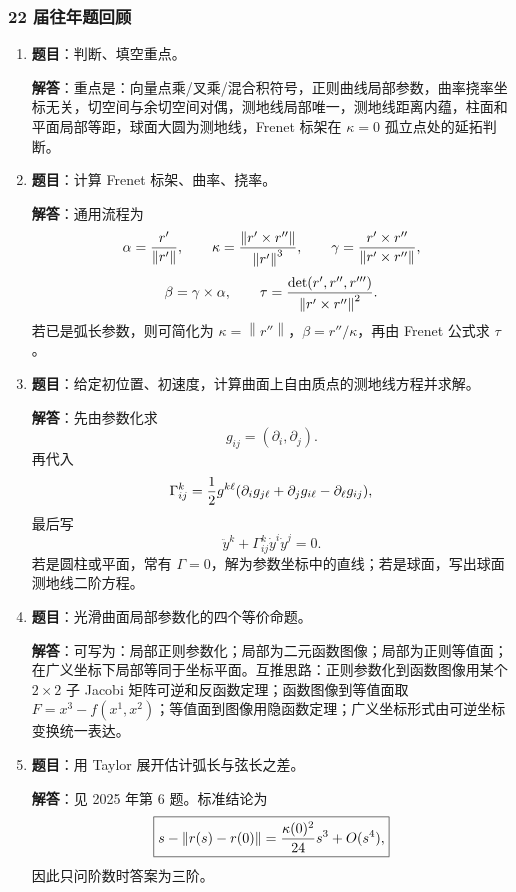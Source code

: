 \documentclass[UTF8,12pt,a4paper]{ctexart}
\newcommand{\norm}[1]{\left\lVert #1\right\rVert}
\newcommand{\inner}[2]{\left(#1,#2\right)}
\begin{document}
\subsubsection{22 届往年题回顾}
\begin{enumerate}
\item \textbf{题目}：判断、填空重点。

\textbf{解答}：重点是：向量点乘/叉乘/混合积符号，正则曲线局部参数，曲率挠率坐标无关，切空间与余切空间对偶，测地线局部唯一，测地线距离内蕴，柱面和平面局部等距，球面大圆为测地线，Frenet 标架在 $\kappa=0$ 孤立点处的延拓判断。

\item \textbf{题目}：计算 Frenet 标架、曲率、挠率。

\textbf{解答}：通用流程为
\[
\alpha={r'\over\norm{r'}},\qquad
\kappa={\norm{r'\times r''}\over\norm{r'}^3},\qquad
\gamma={r'\times r''\over\norm{r'\times r''}},
\]
\[
\beta=\gamma\times\alpha,\qquad
\tau={\det(r',r'',r''')\over\norm{r'\times r''}^2}.
\]
若已是弧长参数，则可简化为 $\kappa=\norm{r''}$，$\beta=r''/\kappa$，再由 Frenet 公式求 $\tau$。

\item \textbf{题目}：给定初位置、初速度，计算曲面上自由质点的测地线方程并求解。

\textbf{解答}：先由参数化求
\[
g_{ij}=\inner{\partial_i}{\partial_j}.
\]
再代入
\[
\Gamma^k_{ij}={1\over2}g^{k\ell}(\partial_i g_{j\ell}+\partial_jg_{i\ell}-\partial_\ell g_{ij}),
\]
最后写
\[
\ddot y^k+\Gamma^k_{ij}\dot y^i\dot y^j=0.
\]
若是圆柱或平面，常有 $\Gamma=0$，解为参数坐标中的直线；若是球面，写出球面测地线二阶方程。

\item \textbf{题目}：光滑曲面局部参数化的四个等价命题。

\textbf{解答}：可写为：局部正则参数化；局部为二元函数图像；局部为正则等值面；在广义坐标下局部等同于坐标平面。互推思路：正则参数化到函数图像用某个 $2\times2$ 子 Jacobi 矩阵可逆和反函数定理；函数图像到等值面取 $F=x^3-f(x^1,x^2)$；等值面到图像用隐函数定理；广义坐标形式由可逆坐标变换统一表达。

\item \textbf{题目}：用 Taylor 展开估计弧长与弦长之差。

\textbf{解答}：见 2025 年第 6 题。标准结论为
\[
\boxed{s-\norm{r(s)-r(0)}={\kappa(0)^2\over24}s^3+O(s^4),}
\]
因此只问阶数时答案为三阶。
\end{enumerate}
\end{document}
